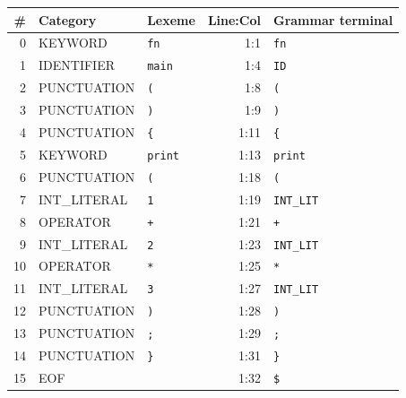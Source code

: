 \begin{tabular}{@{}rllrl@{}}\toprule
\textbf{\#} & \textbf{Category} & \textbf{Lexeme} & \textbf{Line:Col} & \textbf{Grammar terminal}\\ \midrule
0 & KEYWORD & \texttt{fn} & 1:1 & \texttt{fn}\\
1 & IDENTIFIER & \texttt{main} & 1:4 & \texttt{ID}\\
2 & PUNCTUATION & \texttt{(} & 1:8 & \texttt{(}\\
3 & PUNCTUATION & \texttt{)} & 1:9 & \texttt{)}\\
4 & PUNCTUATION & \texttt{\{} & 1:11 & \texttt{\{}\\
5 & KEYWORD & \texttt{print} & 1:13 & \texttt{print}\\
6 & PUNCTUATION & \texttt{(} & 1:18 & \texttt{(}\\
7 & INT\_LITERAL & \texttt{1} & 1:19 & \texttt{INT\_LIT}\\
8 & OPERATOR & \texttt{+} & 1:21 & \texttt{+}\\
9 & INT\_LITERAL & \texttt{2} & 1:23 & \texttt{INT\_LIT}\\
10 & OPERATOR & \texttt{*} & 1:25 & \texttt{*}\\
11 & INT\_LITERAL & \texttt{3} & 1:27 & \texttt{INT\_LIT}\\
12 & PUNCTUATION & \texttt{)} & 1:28 & \texttt{)}\\
13 & PUNCTUATION & \texttt{;} & 1:29 & \texttt{;}\\
14 & PUNCTUATION & \texttt{\}} & 1:31 & \texttt{\}}\\
15 & EOF & \texttt{} & 1:32 & \texttt{\$}\\
\bottomrule
\end{tabular}
